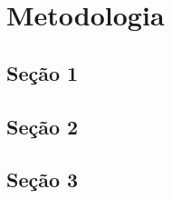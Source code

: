 \chapter{Metodologia}
\label{chap:metodologia}

\section{Seção 1}



\section{Seção 2}



\section{Seção 3}